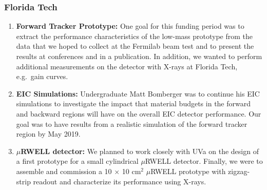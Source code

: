 \subsubsection{Florida Tech} 
\begin{enumerate}
\item \textbf{Forward Tracker Prototype:} One goal for this funding period was to extract the performance characteristics of the low-mass prototype from the data that we hoped to collect at the Fermilab beam test and to present the results at conferences and in a publication. In addition, we wanted to perform additional measurements on the detector with X-rays at Florida Tech, e.g.\ gain curves.
%
\item \textbf{EIC Simulations:} Undergraduate Matt Bomberger was to continue his EIC simulations to investigate the impact that material budgets in the forward and backward regions will have on the overall EIC detector performance. Our goal was to have results from a realistic simulation of the forward tracker region by May 2019.
%
\item \textbf{$\mu$RWELL detector:} We planned to work closely with UVa on the design of a first prototype for a small cylindrical $\mu$RWELL detector. Finally, we were to assemble and commission a 10 $\times$ 10 cm$^2$ $\mu$RWELL prototype with zigzag-strip readout and characterize its performance using X-rays.
\end{enumerate}
